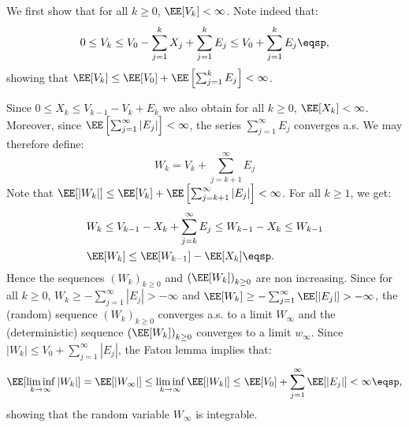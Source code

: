 \documentclass{article}
\makeatletter
\renewenvironment{proof}[1][\proofname]{%
   \par\pushQED{\qed}\normalfont%
   \topsep6\p@\@plus6\p@\relax
   \trivlist\item[\hskip\labelsep\bfseries#1]%
   \ignorespaces
}{%
   \popQED\endtrivlist\@endpefalse
}
\makeatother
\begin{document}
\begin{proof}
  We first show that for all $k \geq 0$, $\EE[V_k] < \infty$. Note indeed that:
\begin{equation}
0 \leq V_k \leq V_0 - \sum_{j=1}^{k}{X_j} + \sum_{j=1}^{k}{E_j}\leq V_0 + \sum_{j=1}^{k}{E_j} \eqsp,
\end{equation}
showing that $\EE[V_k] \leq \EE[V_0] + \EE\left[\sum_{j=1}^{k}{E_j}\right] < \infty$.

Since $0 \leq X_k \leq V_{k-1} - V_k + E_k$ we also obtain for all $k \geq 0$, $\EE[X_k] < \infty$. Moreover, since $\EE\left[\sum_{j=1}^{\infty}{|E_j|}\right] < \infty$, the series $\sum_{j=1}^{\infty}{E_j}$ converges a.s. We may therefore define:
\begin{equation}
W_k = V_k + \sum_{j=k+1}^{\infty}{E_j}
\end{equation}
Note that $\EE[|W_k|] \leq \EE[V_k]+\EE\left[\sum_{j=k+1}^{\infty}{|E_j|}\right] < \infty $. For all $k \geq 1$, we get:
\begin{equation}\label{chik}
\begin{split}
& W_{k} \leq V_{k-1} - X_{k} + \sum_{j=k}^{\infty}{E_j} \leq W_{k-1} - X_{k}\leq W_{k-1}\\
&\EE[W_k] \leq \EE[W_{k-1}] - \EE[X_{k}] \eqsp.
\end{split}
\end{equation}
Hence the sequences $(W_k)_{k\geq0}$ and $\left(\EE[W_k] \right)_{k\geq0}$ are non increasing. Since for all $k \geq 0$, $W_k \geq -  \sum_{j=1}^{\infty}{|E_j|} > -\infty$ and $\EE[W_k] \geq -  \sum_{j=1}^{\infty}{\EE[|E_j|]} > -\infty$, the (random) sequence $(W_k)_{k\geq0}$ converges a.s. to a limit $W_{\infty}$ and the (deterministic) sequence $\left(\EE[W_k] \right)_{k\geq0}$ converges to a limit $w_{\infty}$. Since $|W_k| \leq V_0 +  \sum_{j=1}^{\infty}{|E_j|}$, the Fatou lemma implies that:
\begin{equation}
\EE[\liminf \limits_{k \to \infty} |W_k|] = \EE[|W_{\infty}|] \leq \liminf \limits_{k \to \infty} \EE[|W_{k}|] \leq \EE[V_{0}] + \sum_{j=1}^{\infty}{\EE[|E_j|]}< \infty \eqsp,
\end{equation}
showing that the random variable $W_{\infty}$  is integrable.


\end{proof}
\end{document}
